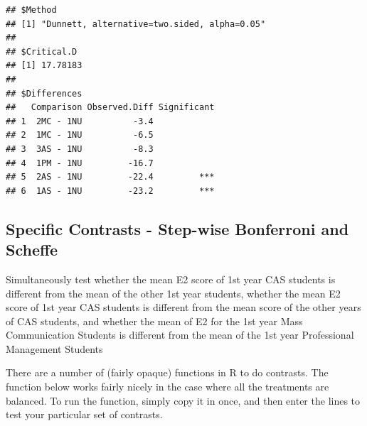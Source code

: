 \documentclass[
]{book}
\begin{document}
\begin{verbatim}
## $Method
## [1] "Dunnett, alternative=two.sided, alpha=0.05"
## 
## $Critical.D
## [1] 17.78183
## 
## $Differences
##   Comparison Observed.Diff Significant
## 1  2MC - 1NU          -3.4            
## 2  1MC - 1NU          -6.5            
## 3  3AS - 1NU          -8.3            
## 4  1PM - 1NU         -16.7            
## 5  2AS - 1NU         -22.4         ***
## 6  1AS - 1NU         -23.2         ***
\end{verbatim}

\hypertarget{specific-contrasts---step-wise-bonferroni-and-scheffe}{%
\subsection{Specific Contrasts - Step-wise Bonferroni and Scheffe}\label{specific-contrasts---step-wise-bonferroni-and-scheffe}}

Simultaneously test whether the mean E2 score of 1st year CAS students is different from the mean of the other 1st year students, whether the mean E2 score of 1st year CAS students is different from the mean score of the other years of CAS students, and whether the mean of E2 for the 1st year Mass Communication Students is different from the mean of the 1st year Professional Management Students

There are a number of (fairly opaque) functions in R to do contrasts. The function below works fairly nicely in the case where all the treatments are balanced. To run the function, simply copy it in once, and then enter the lines to test your particular set of contrasts.
\end{document}
